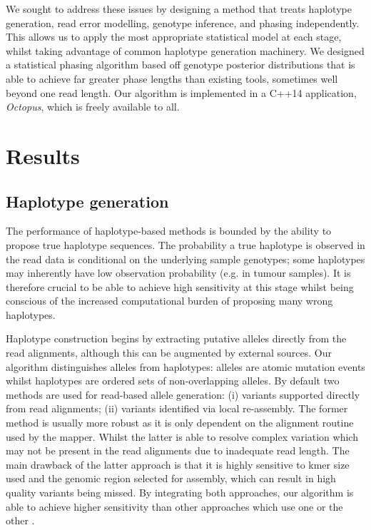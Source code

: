 \documentclass[notitlepage, twocolumn]{article}
\begin{document}
We sought to address these issues by designing a method that treats haplotype generation, read error modelling, genotype inference, and phasing independently. This allows us to apply the most appropriate statistical model at each stage, whilst taking advantage of common haplotype generation machinery. We designed a statistical phasing algorithm based off genotype posterior distributions that is able to achieve far greater phase lengths than existing tools, sometimes well beyond one read length. Our algorithm is implemented in a C++14 application, \textit{Octopus}, which is freely available to all.

\section*{Results}

\subsection*{Haplotype generation}

The performance of haplotype-based methods is bounded by the ability to propose true haplotype sequences. The probability a true haplotype is observed in the read data is conditional on the underlying sample genotypes; some haplotypes may inherently have low observation probability (e.g. in tumour samples). It is therefore crucial to be able to achieve high sensitivity at this stage whilst being conscious of the increased computational burden of proposing many wrong haplotypes.

Haplotype construction begins by extracting putative alleles directly from the read alignments, although this can be augmented by external sources. Our algorithm distinguishes alleles from haplotypes: alleles are atomic mutation events whilst haplotypes are ordered sets of non-overlapping alleles. By default two methods are used for read-based allele generation: (i) variants supported directly from read alignments; (ii) variants identified via local re-assembly. The former method is usually more robust as it is only dependent on the alignment routine used by the mapper. Whilst the latter is able to resolve complex variation which may not be present in the read alignments due to inadequate read length. The main drawback of the latter approach is that it is highly sensitive to kmer size used and the genomic region selected for assembly, which can result in high quality variants being missed. By integrating both approaches, our algorithm is able to achieve higher sensitivity than other approaches which use one or the other \cite{RN141, RN538}.
\end{document}
